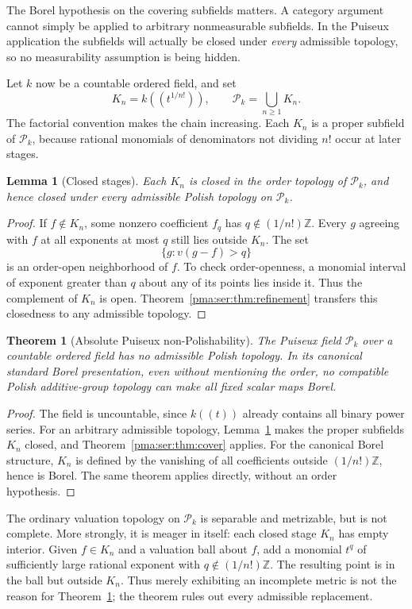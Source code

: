 \documentclass[11pt]{article}
\numberwithin{equation}{section}
\newtheorem{theorem}{Theorem}[section]
\newtheorem{lemma}[lemma]{Lemma}
\theoremstyle{definition}
\theoremstyle{remark}
\newcommand{\Z}{\mathbb Z}
\newcommand{\Pk}{\mathcal P_k}
\begin{document}
The Borel hypothesis on the covering subfields matters. A category argument
cannot simply be applied to arbitrary nonmeasurable subfields. In the Puiseux
application the subfields will actually be closed under \emph{every}
admissible topology, so no measurability assumption is being hidden.

Let $k$ now be a countable ordered field, and set
\[
 K_n=k((t^{1/n!})),\qquad \Pk=\bigcup_{n\geq1}K_n.
\]
The factorial convention makes the chain increasing. Each $K_n$ is a proper
subfield of $\Pk$, because rational monomials of denominators not dividing
$n!$ occur at later stages.

\begin{lemma}[Closed stages]\label{pma:ser:lem:stages}
Each $K_n$ is closed in the order topology of $\Pk$, and hence closed under
every admissible Polish topology on $\Pk$.
\end{lemma}
\begin{proof}
If $f\notin K_n$, some nonzero coefficient $f_q$ has
$q\notin(1/n!)\Z$. Every $g$ agreeing with $f$ at all exponents at most $q$
still lies outside $K_n$. The set
\[
 \{g:v(g-f)>q\}
\]
is an order-open neighborhood of $f$. To check order-openness, a monomial
interval of exponent greater than $q$ about any of its points lies inside it.
Thus the complement of $K_n$ is open. Theorem~\ref{pma:ser:thm:refinement} transfers
this closedness to any admissible topology.
\end{proof}

\begin{theorem}[Absolute Puiseux non-Polishability]\label{pma:ser:thm:puiseux}
The Puiseux field $\Pk$ over a countable ordered field has no admissible
Polish topology. In its canonical standard Borel presentation, even without
mentioning the order, no compatible Polish additive-group topology can make
all fixed scalar maps Borel.
\end{theorem}
\begin{proof}
The field is uncountable, since $k((t))$ already contains all binary power
series. For an arbitrary admissible topology, Lemma~\ref{pma:ser:lem:stages} makes the
proper subfields $K_n$ closed, and Theorem~\ref{pma:ser:thm:cover} applies.
For the canonical Borel structure, $K_n$ is defined by the vanishing of all
coefficients outside $(1/n!)\Z$, hence is Borel. The same theorem applies
directly, without an order hypothesis.
\end{proof}

The ordinary valuation topology on $\Pk$ is separable and metrizable, but is
not complete. More strongly, it is meager in itself: each closed stage $K_n$
has empty interior. Given $f\in K_n$ and a valuation ball about $f$, add a
monomial $t^q$ of sufficiently large rational exponent with
$q\notin(1/n!)\Z$. The resulting point is in the ball but outside $K_n$.
Thus merely exhibiting an incomplete metric is not the reason for
Theorem~\ref{pma:ser:thm:puiseux}; the theorem rules out every admissible replacement.
\end{document}
